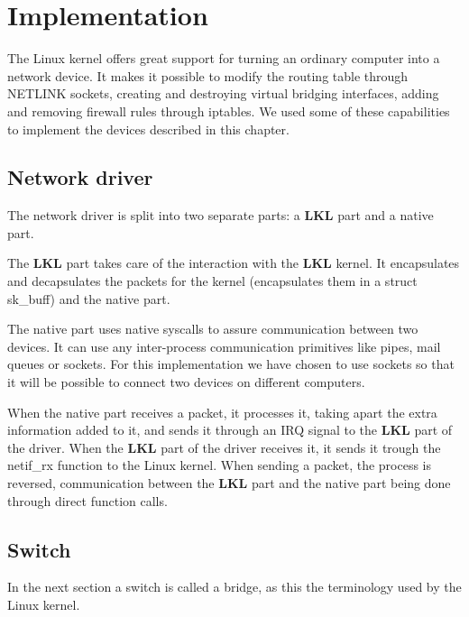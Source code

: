 \chapter{Implementation}
\label{chapter:impl}

The Linux kernel offers great support for turning an ordinary
computer into a network device. It makes it possible to modify the routing 
table through NETLINK sockets, creating and destroying virtual 
bridging interfaces, adding and removing firewall rules through 
iptables. We used some of these capabilities to implement the 
devices described in this chapter.

\section{Network driver}
\label{sec:net-driver}


The network driver is split into two separate parts: a \textbf{LKL} part 
and a native part.

The \textbf{LKL} part takes care of the interaction with the \textbf{LKL} kernel.
It encapsulates and decapsulates the packets for the kernel
(encapsulates them in a struct sk_buff) and the native part.

The native part uses native syscalls to assure communication 
between two devices. It can use any inter-process communication 
primitives like pipes, mail queues or sockets.
For this implementation we have chosen to use 
sockets so that it will be possible to connect two devices 
on different computers.

When the native part receives a packet, it processes it, taking apart
the extra information added to it,  and sends it through an IRQ signal
to the \textbf{LKL} part of the driver. When the \textbf{LKL} part of the driver receives it,
it sends it trough the netif_rx function to the Linux kernel. When sending
a packet, the process is reversed, communication between the \textbf{LKL} part and the
native part being done through direct function calls.

\section{Switch}
\label{sec:switch-impl}

In the next section a switch is called a bridge, as this the terminology used by the Linux kernel.

